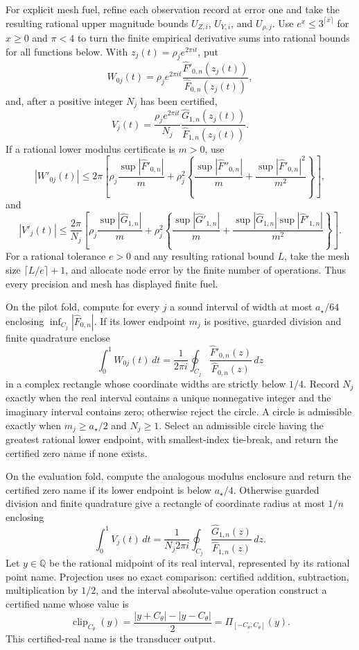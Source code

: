 For explicit mesh fuel, refine each observation record at error one and take the resulting rational upper magnitude bounds \(U_{Z,i}\), \(U_{Y,i}\), and \(U_{\rho,j}\).  Use \(e^x\le3^{\lceil x\rceil}\) for \(x\ge0\) and \(\pi<4\) to turn the finite empirical derivative sums into rational bounds for all functions below.  With \(z_j(t)=\rho_je^{2\pi it}\), put
\[
 W_{0j}(t)=
 \rho_je^{2\pi it}
 \frac{\widehat F'_{0,n}(z_j(t))}
      {\widehat F_{0,n}(z_j(t))},
\]
and, after a positive integer \(N_j\) has been certified,
\[
 V_j(t)=
 \frac{\rho_je^{2\pi it}}{N_j}
 \frac{\widehat G_{1,n}(z_j(t))}
      {\widehat F_{1,n}(z_j(t))}.
\]
If a rational lower modulus certificate is \(m>0\), use
\[
 |W'_{0j}(t)|\le
 2\pi\left[
 \rho_j\frac{\sup|\widehat F'_{0,n}|}{m}
 +\rho_j^2\left\{
 \frac{\sup|\widehat F''_{0,n}|}{m}
 +\frac{\sup|\widehat F'_{0,n}|^2}{m^2}
 \right\}\right],
\]
and
\[
 |V'_j(t)|\le
 \frac{2\pi}{N_j}\left[
 \rho_j\frac{\sup|\widehat G_{1,n}|}{m}
 +\rho_j^2\left\{
 \frac{\sup|\widehat G'_{1,n}|}{m}
 +\frac{\sup|\widehat G_{1,n}|\sup|\widehat F'_{1,n}|}{m^2}
 \right\}\right].
\]
For a rational tolerance \(e>0\) and any resulting rational bound \(L\), take the mesh size \(\lceil L/e\rceil+1\), and allocate node error by the finite number of operations.  Thus every precision and mesh has displayed finite fuel.

On the pilot fold, compute for every \(j\) a sound interval of width at most \(a_{\star}/64\) enclosing \(\inf_{C_j}|\widehat F_{0,n}|\).  If its lower endpoint \(m_j\) is positive, guarded division and finite quadrature enclose
\[
 \int_0^1W_{0j}(t)\,dt
 =\frac{1}{2\pi i}\oint_{C_j}
   \frac{\widehat F'_{0,n}(z)}{\widehat F_{0,n}(z)}\,dz
\]
in a complex rectangle whose coordinate widths are strictly below \(1/4\).  Record \(N_j\) exactly when the real interval contains a unique nonnegative integer and the imaginary interval contains zero; otherwise reject the circle.  A circle is admissible exactly when \(m_j\ge a_{\star}/2\) and \(N_j\ge1\).  Select an admissible circle having the greatest rational lower endpoint, with smallest-index tie-break, and return the certified zero name if none exists.

On the evaluation fold, compute the analogous modulus enclosure and return the certified zero name if its lower endpoint is below \(a_{\star}/4\).  Otherwise guarded division and finite quadrature give a rectangle of coordinate radius at most \(1/n\) enclosing
\[
 \int_0^1V_j(t)\,dt
 =\frac{1}{N_j2\pi i}\oint_{C_j}
   \frac{\widehat G_{1,n}(z)}{\widehat F_{1,n}(z)}\,dz.
\]
Let \(y\in\mathbb Q\) be the rational midpoint of its real interval, represented by its rational point name.  Projection uses no exact comparison: certified addition, subtraction, multiplication by \(1/2\), and the interval absolute-value operation construct a certified name whose value is
\[
 \operatorname{clip}_{C_{\theta}}(y)
 =\frac{|y+C_{\theta}|-|y-C_{\theta}|}{2}
 =\Pi_{[-C_{\theta},C_{\theta}]}(y).
\]
This certified-real name is the transducer output.


